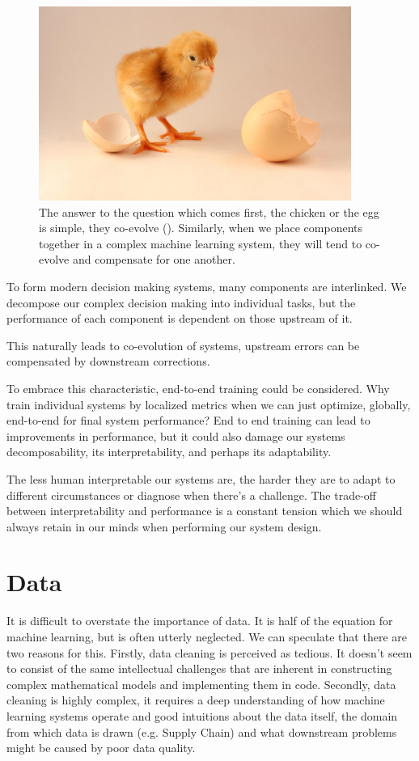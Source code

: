\documentclass[a4paper]{caesar_book}
\begin{document}
\begin{figure}[htbp]%
	\includegraphics[height=180pt,width=\textwidth]{pictures/chicken-and-egg.jpg}%
	\caption*{The answer to the question which comes first, the chicken or the egg is simple, they co-evolve (\cite{Platnick1963ConjecturesAR}). Similarly, when we place components together in a complex machine learning system, they will tend to co-evolve and compensate for one another.}%
	\label{}%
\end{figure}%

To form modern decision making systems, many components are interlinked. We decompose our complex decision making into individual tasks, but the performance of each component is dependent on those upstream of it.

This naturally leads to co-evolution of systems, upstream errors can be compensated by downstream corrections.

To embrace this characteristic, end-to-end training could be considered. Why train individual systems by localized metrics when we can just optimize, globally, end-to-end for final system performance? End to end training can lead to improvements in performance, but it could also damage our systems decomposability, its interpretability, and perhaps its adaptability.

The less human interpretable our systems are, the harder they are to adapt to different circumstances or diagnose when there's a challenge. The trade-off between interpretability and performance is a constant tension which we should always retain in our minds when performing our system design.

\section{Data}

It is difficult to overstate the importance of data. It is half of the equation for machine learning, but is often utterly neglected. We can speculate that there are two reasons for this. Firstly, data cleaning is perceived as tedious. It doesn't seem to consist of the same intellectual challenges that are inherent in constructing complex mathematical models and implementing them in code. Secondly, data cleaning is highly complex, it requires a deep understanding of how machine learning systems operate and good intuitions about the data itself, the domain from which data is drawn (e.g. Supply Chain) and what downstream problems might be caused by poor data quality.
\end{document}
